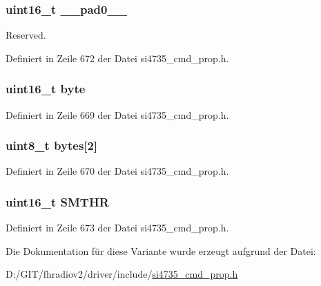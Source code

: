 \subsubsection[{\+\_\+\+\_\+pad0\+\_\+\+\_\+}]{\setlength{\rightskip}{0pt plus 5cm}uint16\+\_\+t \+\_\+\+\_\+pad0\+\_\+\+\_\+}\label{unionfm__soft__mute__snr__thres_a77132c2c26a75f5b8751b235cda23828}


Reserved. 



Definiert in Zeile 672 der Datei si4735\+\_\+cmd\+\_\+prop.\+h.

\hypertarget{unionfm__soft__mute__snr__thres_ab0549c1b5ea980a02e7eab77e21fea49}{}
\subsubsection[{byte}]{\setlength{\rightskip}{0pt plus 5cm}uint16\+\_\+t byte}\label{unionfm__soft__mute__snr__thres_ab0549c1b5ea980a02e7eab77e21fea49}


Definiert in Zeile 669 der Datei si4735\+\_\+cmd\+\_\+prop.\+h.

\hypertarget{unionfm__soft__mute__snr__thres_a46e4c05d20a047ec169f60d3167e912e}{}
\subsubsection[{bytes}]{\setlength{\rightskip}{0pt plus 5cm}uint8\+\_\+t bytes\mbox{[}2\mbox{]}}\label{unionfm__soft__mute__snr__thres_a46e4c05d20a047ec169f60d3167e912e}


Definiert in Zeile 670 der Datei si4735\+\_\+cmd\+\_\+prop.\+h.

\hypertarget{unionfm__soft__mute__snr__thres_a843deda9d37a8dde2d92e9b98cc5a817}{}
\subsubsection[{S\+M\+T\+H\+R}]{\setlength{\rightskip}{0pt plus 5cm}uint16\+\_\+t S\+M\+T\+H\+R}\label{unionfm__soft__mute__snr__thres_a843deda9d37a8dde2d92e9b98cc5a817}


Definiert in Zeile 673 der Datei si4735\+\_\+cmd\+\_\+prop.\+h.



Die Dokumentation für diese Variante wurde erzeugt aufgrund der Datei\+:\begin{DoxyCompactItemize}
\item 
D\+:/\+G\+I\+T/fhradiov2/driver/include/\hyperlink{si4735__cmd__prop_8h}{si4735\+\_\+cmd\+\_\+prop.\+h}\end{DoxyCompactItemize}
